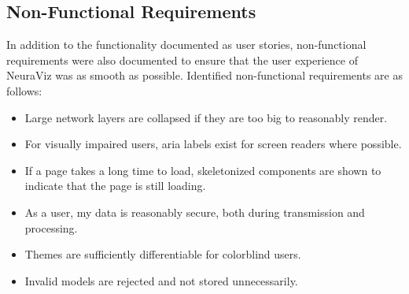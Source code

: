 \subsection{Non-Functional Requirements}
In addition to the functionality documented as user stories, non-functional requirements were also documented to ensure that the user experience of NeuraViz was as smooth as possible. Identified non-functional requirements are as follows:
\begin{itemize}
    \item Large network layers are collapsed if they are too big to reasonably render.
    \item For visually impaired users, aria labels exist for screen readers where possible.
    \item If a page takes a long time to load, skeletonized components are shown to indicate that the page is still loading.
    \item As a user, my data is reasonably secure, both during transmission and processing.
    \item Themes are sufficiently differentiable for colorblind users.
    \item Invalid models are rejected and not stored unnecessarily.
\end{itemize}
